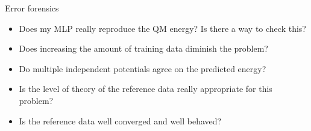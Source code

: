 \documentclass[9pt,bestpractices]{livecoms}
\begin{document}
\begin{Checklists*}[p!]
\begin{checklist}{Error forensics}
\begin{itemize}
\item Does my MLP really reproduce the QM energy? Is there a way to check this?
\item Does increasing the amount of training data diminish the problem?
\item Do multiple independent potentials agree on the predicted energy?
\item Is the level of theory of the reference data really appropriate for this
problem?
\item Is the reference data well converged and well behaved?
\end{itemize}
\end{checklist}

\end{Checklists*}
\end{document}
